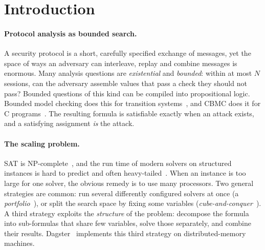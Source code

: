 \documentclass[11pt,a4paper]{article}
\begin{document}
\section{Introduction}
\label{sec:intro}

\paragraph{Protocol analysis as bounded search.}
A security protocol is a short, carefully specified exchange of messages, yet the space of
ways an adversary can interleave, replay and combine messages is enormous. Many analysis
questions are \emph{existential} and \emph{bounded}: within at most $N$ sessions, can the
adversary assemble values that pass a check they should not pass? Bounded questions of this
kind can be compiled into propositional logic. Bounded model checking does this for
transition systems~\cite{biere1999bmc}, and CBMC does it for C programs~\cite{clarke2004cbmc}.
The resulting formula is satisfiable exactly when an attack exists, and a satisfying
assignment \emph{is} the attack.

\paragraph{The scaling problem.}
SAT is NP-complete~\cite{cook1971}, and the run time of modern solvers on structured
instances is hard to predict and often heavy-tailed~\cite{gomes2000heavy}. When an
instance is too large for one solver, the obvious remedy is to use many processors. Two
general strategies are common: run several differently configured solvers at once (a
\emph{portfolio}~\cite{hamadi2009manysat}), or split the search space by fixing some
variables (\emph{cube-and-conquer}~\cite{heule2011cube}). A third strategy exploits the
\emph{structure} of the problem: decompose the formula into sub-formulas that share few
variables, solve those separately, and combine their results.
Dagster~\cite{burgess2022dagster,burgess2023dagster,dagster} implements this third strategy on distributed-memory machines.
\end{document}
